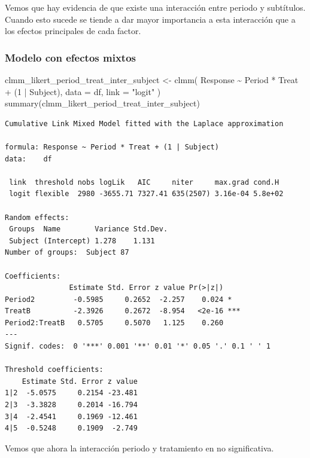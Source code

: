 \documentclass[
  letterpaper,
  DIV=11,
  numbers=noendperiod]{scrartcl}
\newenvironment{Shaded}{\begin{snugshade}}{\end{snugshade}}
\newcommand{\AttributeTok}[1]{\textcolor[rgb]{0.40,0.45,0.13}{#1}}
\newcommand{\DecValTok}[1]{\textcolor[rgb]{0.68,0.00,0.00}{#1}}
\newcommand{\FunctionTok}[1]{\textcolor[rgb]{0.28,0.35,0.67}{#1}}
\newcommand{\NormalTok}[1]{\textcolor[rgb]{0.00,0.23,0.31}{#1}}
\newcommand{\OtherTok}[1]{\textcolor[rgb]{0.00,0.23,0.31}{#1}}
\newcommand{\SpecialCharTok}[1]{\textcolor[rgb]{0.37,0.37,0.37}{#1}}
\newcommand{\StringTok}[1]{\textcolor[rgb]{0.13,0.47,0.30}{#1}}
\begin{document}
Vemos que hay evidencia de que existe una interacción entre periodo y
subtítulos. Cuando esto sucede se tiende a dar mayor importancia a esta
interacción que a los efectos principales de cada factor.

\hypertarget{modelo-con-efectos-mixtos}{%
\subsubsection{Modelo con efectos
mixtos}\label{modelo-con-efectos-mixtos}}

\begin{Shaded}
\begin{Highlighting}[]
\NormalTok{clmm\_likert\_period\_treat\_inter\_subject }\OtherTok{\textless{}{-}}
    \FunctionTok{clmm}\NormalTok{(}
\NormalTok{        Response }\SpecialCharTok{\textasciitilde{}}\NormalTok{ Period }\SpecialCharTok{*}\NormalTok{ Treat }\SpecialCharTok{+}\NormalTok{ (}\DecValTok{1} \SpecialCharTok{|}\NormalTok{ Subject),}
        \AttributeTok{data =}\NormalTok{ df, }\AttributeTok{link =} \StringTok{"logit"}
\NormalTok{    )}
\FunctionTok{summary}\NormalTok{(clmm\_likert\_period\_treat\_inter\_subject)}
\end{Highlighting}
\end{Shaded}

\begin{verbatim}
Cumulative Link Mixed Model fitted with the Laplace approximation

formula: Response ~ Period * Treat + (1 | Subject)
data:    df

 link  threshold nobs logLik   AIC     niter     max.grad cond.H 
 logit flexible  2980 -3655.71 7327.41 635(2507) 3.16e-04 5.8e+02

Random effects:
 Groups  Name        Variance Std.Dev.
 Subject (Intercept) 1.278    1.131   
Number of groups:  Subject 87 

Coefficients:
               Estimate Std. Error z value Pr(>|z|)    
Period2         -0.5985     0.2652  -2.257    0.024 *  
TreatB          -2.3926     0.2672  -8.954   <2e-16 ***
Period2:TreatB   0.5705     0.5070   1.125    0.260    
---
Signif. codes:  0 '***' 0.001 '**' 0.01 '*' 0.05 '.' 0.1 ' ' 1

Threshold coefficients:
    Estimate Std. Error z value
1|2  -5.0575     0.2154 -23.481
2|3  -3.3828     0.2014 -16.794
3|4  -2.4541     0.1969 -12.461
4|5  -0.5248     0.1909  -2.749
\end{verbatim}

Vemos que ahora la interacción periodo y tratamiento en no
significativa.
\end{document}
